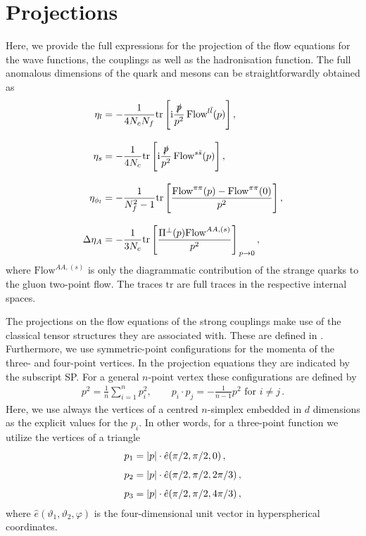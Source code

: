 \documentclass[aps,twocolumn,prd,superscriptaddress]{revtex4-2}
\begin{document}
\section{Projections}	
\label{app:Projections}

Here, we provide the full expressions for the projection of the flow equations for the wave functions, the couplings as well as the hadronisation function. 
The full anomalous dimensions of the quark and mesons can be straightforwardly obtained as
%
\begin{align}\nonumber 
	\eta_l    & = -\frac{1}{4 N_c N_f} {\textrm{tr}}\,\Bigg[
		{\textrm{i}} \frac{\slashed{p}}{p^2}\,\textrm{Flow}^{l\bar l}(p) 
		\Bigg]\,,
	\\[2ex]\nonumber 
	\eta_s    & = -\frac{1}{4 N_c} {\textrm{tr}}\,\Bigg[
	{\textrm{i}} \frac{\slashed{p}}{p^2}\,\textrm{Flow}^{s\bar s}(p) 
	\Bigg]\,,
	\\[2ex]\nonumber 
	\eta_{\phi_l} & = -\frac{1}{N_f^2-1} {\textrm{tr}}\,\Bigg[
		\frac{\textrm{Flow}^{\pi\pi}(p) - \textrm{Flow}^{\pi\pi}(0)}{ p^2}
		\Bigg]\,,
	\\[2ex]
	\Delta\eta_A & = -\frac{1}{3 N_c} {\textrm{tr}}\,\Bigg[
		\frac{\Pi^\perp(p)\textrm{Flow}^{AA,(s)}}{ p^2}
		\Bigg]_{\,p\to0}\,,
	\label{eq:etas}
\end{align}
%
where $\textrm{Flow}^{AA,(s)}$ is only the diagrammatic contribution of the strange quarks to the gluon two-point flow. The traces $\textrm{tr}$ are full traces in the respective internal spaces. 

The projections on the flow equations of the strong couplings make use of the classical tensor structures they are associated with. These are defined in . Furthermore, we use symmetric-point configurations for the momenta of the three- and four-point vertices. In the projection equations they are indicated by the subscript SP.
 For a general $n$-point vertex these configurations are defined by 
%
\begin{align}
	p^2 = \frac{1}{n}\sum_{i=1}^n p_i^2,\qquad p_i\cdot p_j = - \frac{1}{n-1} p^2\,\,\textrm{for $i\neq j$}\,. 
\label{eq:symmetricPoint}
\end{align}
%
Here, we use always the vertices of a centred $n$-simplex embedded in $d$ dimensions as the explicit values for the $p_i$. 
In other words, for a three-point function we utilize the vertices of a triangle
%
\begin{align}\notag 
	p_1 &= |p|\cdot \hat e (\pi/2, \pi/2, 0)\,,          	\\[1ex] \notag
	p_2 &= |p|\cdot \hat e (\pi/2, \pi/2, 2\pi/3)\,,    \\[1ex]
	p_3 &= |p|\cdot \hat e (\pi/2, \pi/2, 4\pi/3)\,, 
\end{align}
%
where $\hat e(\vartheta_1, \vartheta_2, \varphi)$ is the four-dimensional unit vector in hyperspherical coordinates.
\end{document}
